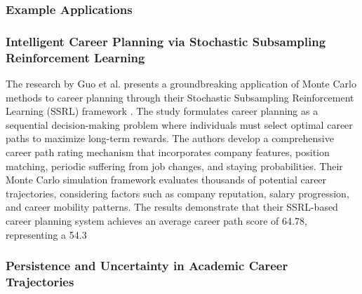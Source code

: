 \documentclass[main.tex]{subfiles}
\begin{document}
\subsubsection{Example Applications}

\subsubsection{Intelligent Career Planning via Stochastic Subsampling Reinforcement Learning}

The research by Guo et al. presents a groundbreaking application of Monte Carlo methods to career planning through their Stochastic Subsampling Reinforcement Learning (SSRL) framework \parencite{guo2022nature,guo2022pmc}. The study formulates career planning as a sequential decision-making problem where individuals must select optimal career paths to maximize long-term rewards. The authors develop a comprehensive career path rating mechanism that incorporates company features, position matching, periodic suffering from job changes, and staying probabilities. Their Monte Carlo simulation framework evaluates thousands of potential career trajectories, considering factors such as company reputation, salary progression, and career mobility patterns. The results demonstrate that their SSRL-based career planning system achieves an average career path score of 64.78, representing a 54.3%

\subsubsection{Persistence and Uncertainty in Academic Career Trajectories}
\end{document}
